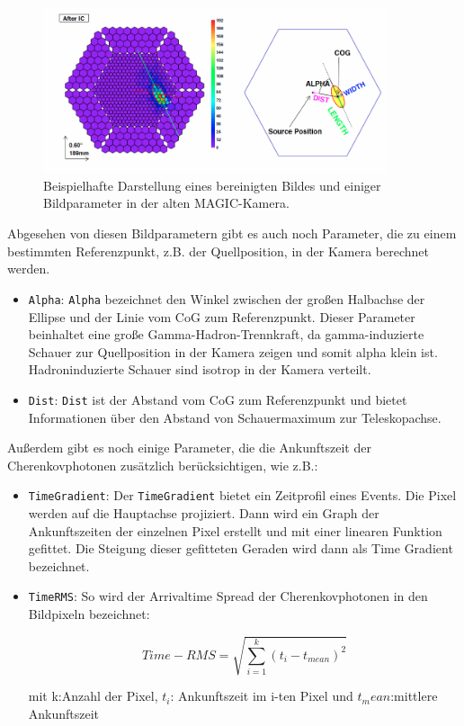 \begin{figure}
    \centering
    \includegraphics[width=0.9\textwidth]{./Plots/03_MonteCarlos/CleaningBild.png}
    \caption{Beispielhafte Darstellung eines bereinigten Bildes und einiger Bildparameter in der alten MAGIC-Kamera.}
    \label{CleaningBild}
\end{figure}

Abgesehen von diesen Bildparametern gibt es auch noch Parameter, die zu einem bestimmten Referenzpunkt, z.B. der Quellposition, in der Kamera berechnet werden. 

\begin{itemize}
 \item \texttt{Alpha}: \texttt{Alpha} bezeichnet den Winkel zwischen der großen Halbachse der Ellipse und der Linie vom CoG zum Referenzpunkt.
 Dieser Parameter beinhaltet eine große Gamma-Hadron-Trennkraft, da gamma-induzierte Schauer zur Quellposition in der Kamera zeigen und somit alpha klein ist.
 Hadroninduzierte Schauer sind isotrop in der Kamera verteilt.
 \item \texttt{Dist}: \texttt{Dist} ist der Abstand vom CoG zum Referenzpunkt und bietet Informationen über den Abstand von Schauermaximum zur Teleskopachse.
\end{itemize}

Außerdem gibt es noch einige Parameter, die die Ankunftszeit der Cherenkovphotonen zusätzlich berücksichtigen, wie z.B.:

\begin{itemize}
 \item \texttt{TimeGradient}: Der \texttt{TimeGradient} bietet ein Zeitprofil eines Events.
 Die Pixel werden auf die Hauptachse projiziert.
 Dann wird ein Graph der Ankunftszeiten der einzelnen Pixel erstellt und mit einer linearen Funktion gefittet.
 Die Steigung dieser gefitteten Geraden wird dann als Time Gradient bezeichnet.
 \item \texttt{TimeRMS}: So wird der Arrivaltime Spread der Cherenkovphotonen in den Bildpixeln bezeichnet:
 
\begin{equation}
 Time-RMS=\sqrt{\sum_{i=1}^k (t_i-t_{mean})^2}
\end{equation}
 \begin{centering}
  \tiny{mit k:Anzahl der Pixel, $t_i$: Ankunftszeit im i-ten Pixel und $t_mean$:mittlere Ankunftszeit}
 \end{centering}


\end{itemize}

